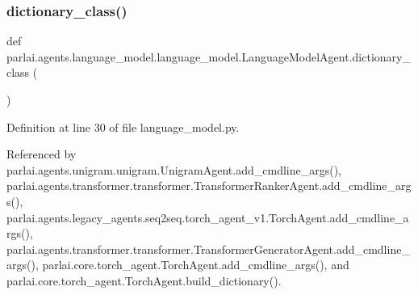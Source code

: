 \subsubsection{\texorpdfstring{dictionary\+\_\+class()}{dictionary\_class()}}
{\footnotesize\ttfamily def parlai.\+agents.\+language\+\_\+model.\+language\+\_\+model.\+Language\+Model\+Agent.\+dictionary\+\_\+class (\begin{DoxyParamCaption}{ }\end{DoxyParamCaption})\hspace{0.3cm}{\ttfamily [static]}}



Definition at line 30 of file language\+\_\+model.\+py.



Referenced by parlai.\+agents.\+unigram.\+unigram.\+Unigram\+Agent.\+add\+\_\+cmdline\+\_\+args(), parlai.\+agents.\+transformer.\+transformer.\+Transformer\+Ranker\+Agent.\+add\+\_\+cmdline\+\_\+args(), parlai.\+agents.\+legacy\+\_\+agents.\+seq2seq.\+torch\+\_\+agent\+\_\+v1.\+Torch\+Agent.\+add\+\_\+cmdline\+\_\+args(), parlai.\+agents.\+transformer.\+transformer.\+Transformer\+Generator\+Agent.\+add\+\_\+cmdline\+\_\+args(), parlai.\+core.\+torch\+\_\+agent.\+Torch\+Agent.\+add\+\_\+cmdline\+\_\+args(), and parlai.\+core.\+torch\+\_\+agent.\+Torch\+Agent.\+build\+\_\+dictionary().


